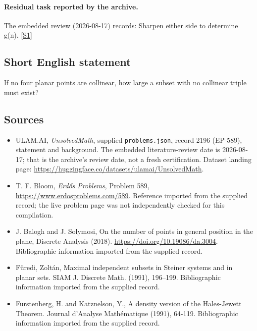 \documentclass[11pt,a4paper]{article}
\newcommand{\sref}[2]{\hyperlink{source:#1:#2}{[S#2]}}
\begin{document}
\paragraph{Residual task reported by the archive.}

The embedded review (2026-08-17) records: Sharpen either side to determine g(n). \sref{2196}{1}

\subsection{Short English statement}

If no four planar points are collinear, how large a subset with no collinear triple must exist?

\subsection{Sources}

{\small

\begin{itemize}

\item[\hypertarget{source:2196:1}{S1}] ULAM.AI, \emph{UnsolvedMath}, supplied \texttt{problems.json}, record 2196 (EP-589), statement and background. The embedded literature-review date is 2026-08-17; that is the archive’s review date, not a fresh certification. Dataset landing page: \url{https://huggingface.co/datasets/ulamai/UnsolvedMath}.

\item[\hypertarget{source:2196:2}{S2}] T. F. Bloom, \emph{Erdős Problems}, Problem 589, \url{https://www.erdosproblems.com/589}. Reference imported from the supplied record; the live problem page was not independently checked for this compilation.

\item[\hypertarget{source:2196:3}{S3}] J. Balogh and J. Solymosi, On the number of points in general position in the plane, Discrete Analysis (2018). \url{https://doi.org/10.19086/da.3004}. Bibliographic information imported from the supplied record.

\item[\hypertarget{source:2196:4}{S4}] F\"{u}redi, Zolt\'an, Maximal independent subsets in {S}teiner systems and in planar sets. SIAM J. Discrete Math. (1991), 196--199. Bibliographic information imported from the supplied record.

\item[\hypertarget{source:2196:5}{S5}] Furstenberg, H. and Katznelson, Y., A density version of the Hales-Jewett Theorem. Journal d'Analyse Math\'{e}matique (1991), 64-119. Bibliographic information imported from the supplied record.

\end{itemize}

}

\label{end:2196}
\end{document}

